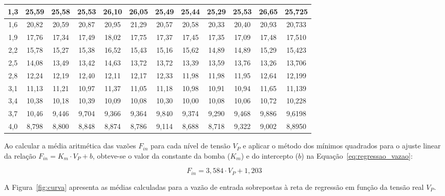 \documentclass[a4paper,12pt]{article}
\begin{document}
\begin{table}[H]
{\begin{tabular}{|c|c|c|c|c|c|c|c|c|c|c|c|}
1,3 & 25,59 & 25,58 & 25,53 & 26,10 & 26,05 & 25,49 & 25,44 & 25,29 & 25,53 & 26,65 & 25,725 \\ \hline
1,6 & 20,82 & 20,59 & 20,87 & 20,95 & 21,29 & 20,57 & 20,58 & 20,33 & 20,40 & 20,93 & 20,733 \\ \hline
1,9 & 17,76 & 17,34 & 17,49 & 18,02 & 17,75 & 17,37 & 17,45 & 17,35 & 17,09 & 17,48 & 17,510 \\ \hline
2,2 & 15,78 & 15,27 & 15,38 & 16,52 & 15,43 & 15,16 & 15,62 & 14,89 & 14,89 & 15,29 & 15,423 \\ \hline
2,5 & 14,08 & 13,49 & 13,42 & 14,63 & 13,72 & 13,72 & 13,39 & 13,59 & 13,76 & 13,26 & 13,706 \\ \hline
2,8 & 12,24 & 12,19 & 12,40 & 12,11 & 12,17 & 12,33 & 11,98 & 11,98 & 11,95 & 12,64 & 12,199 \\ \hline
3,1 & 11,13 & 11,21 & 10,97 & 11,37 & 11,05 & 11,18 & 10,98 & 10,91 & 10,94 & 11,65 & 11,139 \\ \hline
3,4 & 10,38 & 10,18 & 10,39 & 10,09 & 10,08 & 10,30 & 10,00 & 10,08 & 10,06 & 10,72 & 10,228 \\ \hline
3,7 & 10,46 & 9,446 & 9,704 & 9,366 & 9,364 & 9,840 & 9,374 & 9,290 & 9,468 & 9,886 & 9,6198 \\ \hline
4,0 & 8,798 & 8,800 & 8,848 & 8,874 & 8,786 & 9,114 & 8,688 & 8,718 & 9,322 & 9,002 & 8,8950 \\ \hline
\end{tabular}%
}
\end{table}

\begin{justify}
    \hspace{4ex}Ao calcular a média aritmética das vazões $F_{in}$ para cada nível de tensão $V_P$ e aplicar o método dos mínimos quadrados para o ajuste linear da relação $F_{in} = K_m \cdot V_P + b$, obteve-se o valor da constante da bomba ($K_m$) e do intercepto ($b$) na Equação~\eqref{eq:regressao_vazao}:
\end{justify}

\begin{equation}
F_{in} = 3,584 \cdot  V_P + 1,203
\label{eq:regressao_vazao}
\end{equation}

\begin{justify}
    \hspace{4ex}A Figura~\ref{fig:curva} apresenta as médias calculadas para a vazão de entrada sobrepostas à reta de regressão em função da tensão real $V_P$.
\end{justify}
\end{document}
